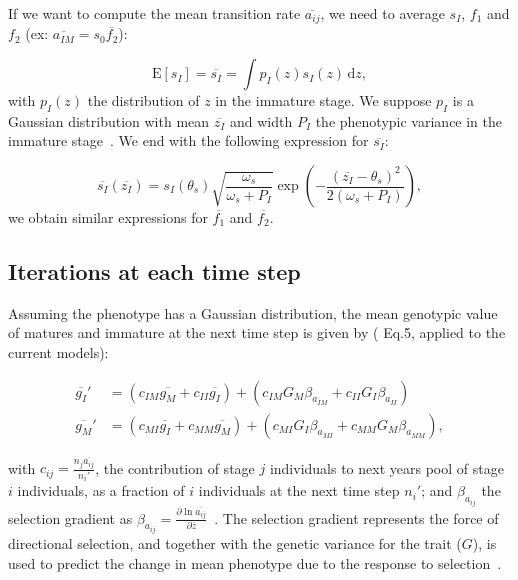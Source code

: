 If we want to compute the mean transition rate $\overline{a_{ij}}$, we need to average $s_I$, $f_1$ and $f_2$ (ex: $\overline{a_{IM}} = s_0 \overline{f_2}$):

\begin{equation}
	\mathrm{E}[s_I] = \overline{s_I} = \int p_I(z)s_I(z)\,\text{d}z,
\end{equation}
with $p_I(z)$ the distribution of $z$ in the immature stage. We suppose $p_I$ is a Gaussian distribution with mean $\overline{z_I}$ and width $P_I$ the phenotypic variance in the immature stage~\citep{lande_quantitative_1982}. We end with the following expression for $\overline{s_I}$:

\begin{equation}
	\label{eq:poplht}
	\overline{s_{I}}(\overline{z_{I}}) = s_{I}(\theta_{s}) \sqrt{\frac{\omega_{s}}{\omega_{s}+P_{I}}}	\exp\left(-\frac{(\overline{z_{I}} - \theta_{s})^2}{2(\omega_{s}+P_{I})}\right),
\end{equation}
we obtain similar expressions for $\overline{f_1}$ and $\overline{f_2}$.	

\subsection*{Iterations at each time step}

Assuming the phenotype has a Gaussian distribution,  the mean genotypic value of matures and immature at the next time step is given by (\citealt{barfield_evolution_2011} Eq.5, applied to the current models):

\begin{subequations}
	\begin{align}
		\label{eq:genotypic}
		\overline{g_{I}}' &= (c_{I M} \overline{g_{M}} + c_{I I} \overline{g_{I}}) + 
			(c_{I M} G_M \beta_{a_{IM}} + c_{I I} G_I \beta_{a_{II}}) \\
		\overline{g_{M}}' &=	 (c_{M I} \overline{g_{I}} + c_{M M} \overline{g_{M}})  +
				(c_{M I} G_I \beta_{a_{MI}} + c_{M M} G_M \beta_{a_{MM}}),
	\end{align}
\end{subequations}

with $c_{ij} = \frac{n_j \overline{a_{ij}}}{n_i'}$, the contribution of stage $j$ individuals to next years pool of stage $i$ individuals, as a fraction of $i$ individuals at the next time step $n_i'$; and $\beta_{a_{ij}}$ the selection gradient as $\beta_{a_{ij}} = \frac{\partial \ln \overline{a_{ij}}}{\partial \overline{z}}$~\citep{barfield_evolution_2011}. The selection gradient represents the force of directional selection, and together with the genetic variance for the trait ($G$), is used to predict the change in mean phenotype due to the response to selection~\citep{lande_quantitative_1982}.

